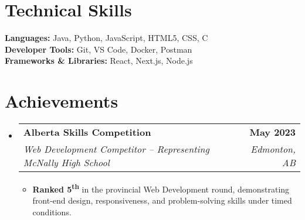 \documentclass[11pt]{article}
\makeatletter
\newcommand{\resumeItem}[1]{
  \item\small{
    {#1 \vspace{-2pt}}
  }
}
\newcommand{\resumeSubheading}[4]{
  \vspace{-2pt}\item
    \begin{tabular*}{1.0\textwidth}[t]{l@{\extracolsep{\fill}}r}
      \textbf{#1} & \textbf{\small #2} \\
      \textit{\small#3} & \textit{\small #4} \\
    \end{tabular*}\vspace{-7pt}
}
\newcommand{\resumeSubHeadingListStart}{\begin{itemize}[leftmargin=0.0in, label={}]}
\newcommand{\resumeSubHeadingListEnd}{\end{itemize}}
\newcommand{\resumeItemListStart}{\begin{itemize}\addtolength{\leftskip}{3pt}}
\newcommand{\resumeItemListEnd}{\end{itemize}\vspace{-5pt}}
\makeatother
\begin{document}
\section{Technical Skills}
\begin{itemize}[leftmargin=0.15in, label={}]
    \small{\item
    \textbf{Languages:} Java, Python, JavaScript, HTML5, CSS, C \\
    \textbf{Developer Tools:} Git, VS Code, Docker, Postman \\
    \textbf{Frameworks \& Libraries:} React, Next.js, Node.js \\
    }
\end{itemize}
\vspace{-16pt}

\section{Achievements}
  \resumeSubHeadingListStart
    \resumeSubheading
      {Alberta Skills Competition}{May 2023}
      {Web Development Competitor -- Representing McNally High School}{Edmonton, AB}
        \resumeItemListStart
            \resumeItem{\textbf{Ranked 5\textsuperscript{th}} in the provincial Web Development round, demonstrating front-end design, responsiveness, and problem-solving skills under timed conditions.}
        \resumeItemListEnd
    \resumeSubHeadingListEnd
\vspace{-15pt}
\end{document}
